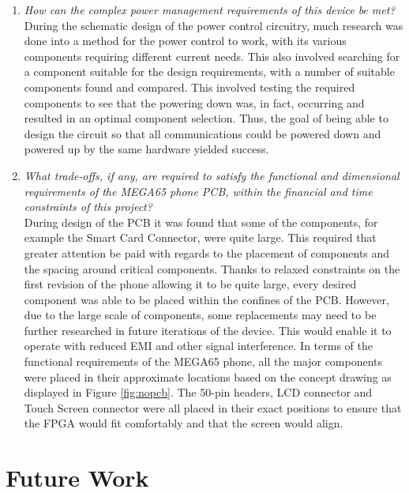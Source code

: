 \begin{enumerate}
\item \textit{How can the complex power management requirements of this device be met?}\\

	During the schematic design of the power control circuitry, much research was done into a method for the power control to work, with its various components requiring different current needs. 
This also involved searching for a component suitable for the design requirements, with a number of suitable components found and compared. 
This involved testing the required components to see that the powering down was, in fact, occurring and resulted in an optimal component selection. 
Thus, the goal of being able to design the circuit so that all communications could be powered down and powered up by the same hardware yielded success.\\
	
\item \textit{What trade-offs, if any, are required to satisfy the functional and dimensional requirements of the MEGA65 phone PCB, within the financial and time constraints of this project?}\\

	During design of the PCB it was found that some of the components, for example the Smart Card Connector, were quite large. 
This required that greater attention be paid with regards to the placement of components and the spacing around critical components. 
Thanks to relaxed constraints on the first revision of the phone allowing it to be quite large, every desired component was able to be placed within the confines of the PCB. 
However, due to the large scale of components, some replacements may need to be further researched in future iterations of the device. 
This would enable it to operate with reduced EMI and other signal interference.
In terms of the functional requirements of the MEGA65 phone, all the major components were placed in their approximate locations based on the concept drawing as displayed in Figure \ref{fig:nopcb}. 
The 50-pin headers, LCD connector and Touch Screen connector were all placed in their exact positions to ensure that the FPGA would fit comfortably and that the screen would align.\\

\end{enumerate}

\section{Future Work}
\label{chap7sec4}

